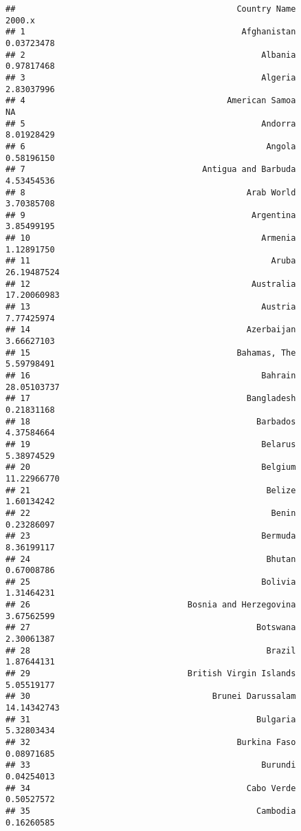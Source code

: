 \documentclass[]{article}
\begin{document}
\begin{verbatim}
##                                             Country Name      2000.x
## 1                                            Afghanistan  0.03723478
## 2                                                Albania  0.97817468
## 3                                                Algeria  2.83037996
## 4                                         American Samoa          NA
## 5                                                Andorra  8.01928429
## 6                                                 Angola  0.58196150
## 7                                    Antigua and Barbuda  4.53454536
## 8                                             Arab World  3.70385708
## 9                                              Argentina  3.85499195
## 10                                               Armenia  1.12891750
## 11                                                 Aruba 26.19487524
## 12                                             Australia 17.20060983
## 13                                               Austria  7.77425974
## 14                                            Azerbaijan  3.66627103
## 15                                          Bahamas, The  5.59798491
## 16                                               Bahrain 28.05103737
## 17                                            Bangladesh  0.21831168
## 18                                              Barbados  4.37584664
## 19                                               Belarus  5.38974529
## 20                                               Belgium 11.22966770
## 21                                                Belize  1.60134242
## 22                                                 Benin  0.23286097
## 23                                               Bermuda  8.36199117
## 24                                                Bhutan  0.67008786
## 25                                               Bolivia  1.31464231
## 26                                Bosnia and Herzegovina  3.67562599
## 27                                              Botswana  2.30061387
## 28                                                Brazil  1.87644131
## 29                                British Virgin Islands  5.05519177
## 30                                     Brunei Darussalam 14.14342743
## 31                                              Bulgaria  5.32803434
## 32                                          Burkina Faso  0.08971685
## 33                                               Burundi  0.04254013
## 34                                            Cabo Verde  0.50527572
## 35                                              Cambodia  0.16260585

\end{verbatim}
\end{document}
